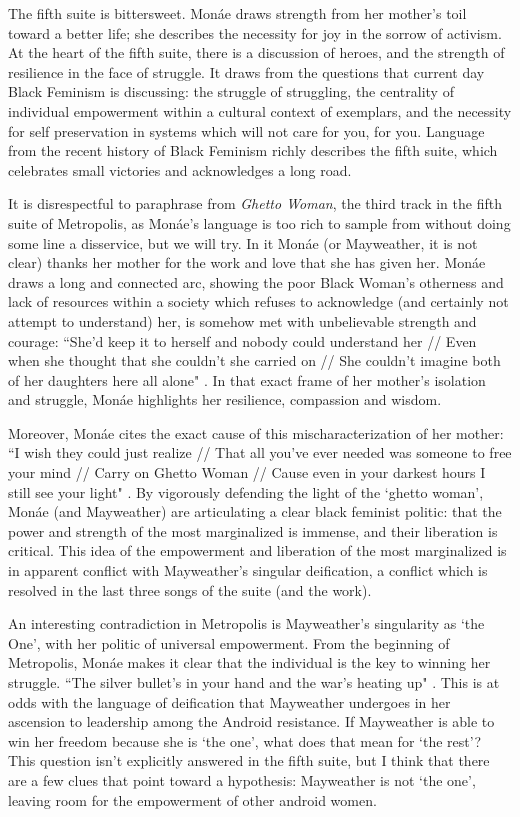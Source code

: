 \documentclass[a4paper, 11pt]{article} %
\begin{document}
The fifth suite is bittersweet.
Mon\'ae draws strength from her mother's toil toward a better life; she describes the necessity for joy in the sorrow of activism.
At the heart of the fifth suite, there is a discussion of heroes, and the strength of resilience in the face of struggle.
It draws from the questions that current day Black Feminism is discussing: the struggle of struggling, the centrality of individual empowerment within a cultural context of exemplars, and the necessity for self preservation in systems which will not care for you, for you.
Language from the recent history of Black Feminism richly describes the fifth suite, which celebrates small victories and acknowledges a long road.

It is disrespectful to paraphrase from \emph{Ghetto Woman}, the third track in the fifth suite of Metropolis, as Mon\'ae's language is too rich to sample from without doing some line a disservice, but we will try.
In it Mon\'ae (or Mayweather, it is not clear) thanks her mother for the work and love that she has given her.
Mon\'ae draws a long and connected arc, showing the poor Black Woman's otherness and lack of resources within a society which refuses to acknowledge (and certainly not attempt to understand) her, is somehow met with unbelievable strength and courage:
``She'd keep it to herself and nobody could understand her // Even when she thought that she couldn't she carried on // She couldn't imagine both of her daughters here all alone" \cite{ghettowoman}.
In that exact frame of her mother's isolation and struggle, Mon\'ae highlights her resilience, compassion and wisdom.

Moreover, Mon\'ae cites the exact cause of this mischaracterization of her mother:
``I wish they could just realize // That all you've ever needed was someone to free your mind // Carry on Ghetto Woman // Cause even in your darkest hours I still see your light" \cite{ghettowoman}.
By vigorously defending the light of the `ghetto woman', Mon\'ae (and Mayweather) are articulating a clear black feminist politic: that the power and strength of the most marginalized is immense, and their liberation is critical. 
This idea of the empowerment and liberation of the most marginalized is in apparent conflict with Mayweather's singular deification, a conflict which is resolved in the last three songs of the suite (and the work).

An interesting contradiction in Metropolis is Mayweather's singularity as `the One', with her politic of universal empowerment.
From the beginning of Metropolis, Mon\'ae makes it clear that the individual is the key to winning her struggle.
``The silver bullet's in your hand and the war's heating up" \cite{manymoons}.
This is at odds with the language of deification that Mayweather undergoes in her ascension to leadership among the Android resistance.
 If Mayweather is able to win her freedom because she is `the one', what does that mean for `the rest'?
This question isn't explicitly answered in the fifth suite, but I think that there are a few clues that point toward a hypothesis: Mayweather is not `the one', leaving room for the empowerment of other android women.
\end{document}
